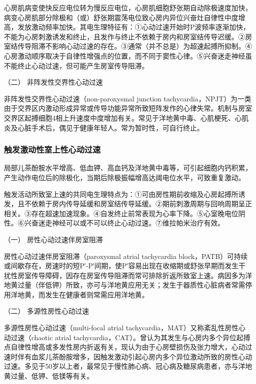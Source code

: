 心房肌病变使快反应电位转为慢反应电位，心房肌细胞舒张期自动除极速度加快，病变心房肌部分除极和（或）舒张期震荡电位致心房内异位兴奋灶自律性中度增高，发放激动频率加快。其电生理特征有：①心动过速开始时P波频率逐渐加快，不能为心房刺激诱发和终止，且发作与终止不依赖于房内和房室结传导迟缓。②房室结传导阻滞不影响心动过速的存在。③通常（并不总是）为超速起搏所抑制。④心房激动顺序取决于自律性增强点的位置，而不同于窦性心律。⑤兴奋迷走神经虽不能终止心动过速，但可能产生房室传导阻滞。

\hypertarget{text00289.htmlux5cux23CHP10-2-2-1-2-2}{}
（二） 非阵发性交界性心动过速

非阵发性交界性心动过速（non-paroxysmal junction
tachycardia，NPJT）为一类由于交界区内激动形成异常或传导功能异常所致短阵发作的心律失常。机制与房室交界区起搏细胞4相上升速度中度增加有关。常见于洋地黄中毒、心肌梗死、心肌炎及心脏手术后，偶见于健康年轻人。常为暂时性，可自行终止。

\subsubsection{触发激动性室上性心动过速}

局部儿茶酚胺水平增高、低血钾、高血钙及洋地黄中毒等，可引起细胞内钙积累，产生动作电位后的除极化，当期后除极振幅增高达阈电位水平，可致重复激动。

触发活动所致室上速的共同电生理特点为：①可由房性期前收缩及心房起搏所诱发，且不依赖于房内传导延缓和房室结传导延缓。②期前刺激周期与回响周期呈正相关。③存在超速加速现象。④自发终止前常表现为心率下降。⑤心室晚电位阴性。⑥兴奋迷走神经可以或不可以终止心动过速。⑦维拉帕米治疗有效。

\hypertarget{text00289.htmlux5cux23CHP10-2-2-1-3-1}{}
（一） 房性心动过速伴房室阻滞

房性心动过速伴房室阻滞（paroxysmal atrial tachycardia
block，PATB）可持续或间歇存在，房速时的短P′-P′间期，使P′容易出现在收缩期或舒张早期而发生干扰性房室传导障碍，因存在房室传导阻滞而常可排除折返所致室上速。病因多为洋地黄过量（伴低钾）所致，亦可与洋地黄应用无关；发生于器质性心脏病者常需停用洋地黄，而发生在健康者则常需应用洋地黄。

\hypertarget{text00289.htmlux5cux23CHP10-2-2-1-3-2}{}
（二） 多源性房性心动过速

多源性房性心动过速（multi-focal atrial
tachycardia，MAT）又称紊乱性房性心动过速（chaotic atrial
tachycardia，CAT）。曾认为其发生与心房内多个异位起搏点自律性增高或多发性房内折返有关，现认为由于心房壁损伤及张力增大，心动过速时伴有血浆儿茶酚胺增多，因触发激动引起心房内多个异位激动所致的房性心动过速。多见于50岁以上者，最常见于慢性肺心病、冠心病及糖尿病患者，亦与洋地黄过量、低钾、低镁等有关。

